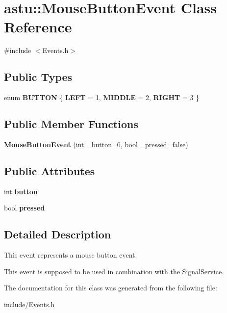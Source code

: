 \hypertarget{classastu_1_1MouseButtonEvent}{}\section{astu\+:\+:Mouse\+Button\+Event Class Reference}
\label{classastu_1_1MouseButtonEvent}


{\ttfamily \#include $<$Events.\+h$>$}

\subsection*{Public Types}
\begin{DoxyCompactItemize}
\item 
\mbox{\label{classastu_1_1MouseButtonEvent_ab01204b34a3eeeb6c92cce127feecb8b}} 
enum {\bfseries B\+U\+T\+T\+ON} \{ {\bfseries L\+E\+FT} = 1, 
{\bfseries M\+I\+D\+D\+LE} = 2, 
{\bfseries R\+I\+G\+HT} = 3
 \}
\end{DoxyCompactItemize}
\subsection*{Public Member Functions}
\begin{DoxyCompactItemize}
\item 
\mbox{\label{classastu_1_1MouseButtonEvent_a1f1617862765f08c21e7344ab3fc0389}} 
{\bfseries Mouse\+Button\+Event} (int \+\_\+button=0, bool \+\_\+pressed=false)
\end{DoxyCompactItemize}
\subsection*{Public Attributes}
\begin{DoxyCompactItemize}
\item 
\mbox{\label{classastu_1_1MouseButtonEvent_a8dfd189ee91334495030426431158d53}} 
int {\bfseries button}
\item 
\mbox{\label{classastu_1_1MouseButtonEvent_ac6af684a515975ad06203d562acf0dcc}} 
bool {\bfseries pressed}
\end{DoxyCompactItemize}


\subsection{Detailed Description}
This event represents a mouse button event.

This event is supposed to be used in combination with the \hyperlink{classastu_1_1SignalService}{Signal\+Service}. 

The documentation for this class was generated from the following file\+:\begin{DoxyCompactItemize}
\item 
include/Events.\+h\end{DoxyCompactItemize}
